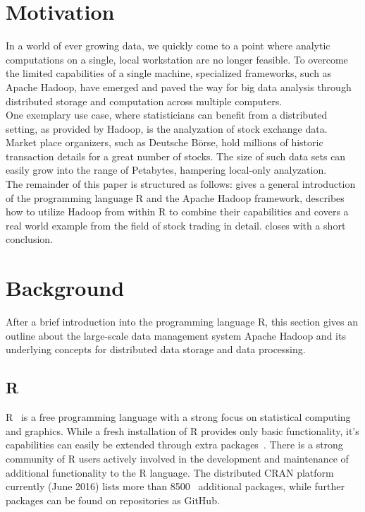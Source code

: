 \chapter{Motivation}
\label{chap:motivation}
In a world of ever growing data, we quickly come to a point where analytic computations on a single, local workstation are no longer feasible. To overcome the limited capabilities of a single machine, specialized frameworks, such as Apache Hadoop, have emerged and paved the way for big data analysis through distributed storage and computation across multiple computers.\\

One exemplary use case, where statisticians can benefit from a distributed setting, as provided by Hadoop, is the analyzation of stock exchange data. Market place organizers, such as Deutsche B\"orse, hold millions of historic transaction details for a great number of stocks. The size of such data sets can easily grow into the range of Petabytes, hampering local-only analyzation.
\\

The remainder of this paper is structured as follows:  gives a general introduction of the programming language R and the Apache Hadoop framework,  describes how to utilize Hadoop from within R to combine their capabilities and  covers a real world example from the field of stock trading in detail.  closes with a short conclusion.


\chapter{Background}
\label{chap:introduction}
After a brief introduction into the programming language R, this section gives an outline about the large-scale data management system Apache Hadoop and its underlying concepts for distributed data storage and data processing.

\section{R}
R~\cite{RLanguage} is a free programming language with a strong focus on statistical computing and graphics.
While a fresh installation of R provides only basic functionality, it's capabilities can easily be extended through extra packages~\cite{rPackages}. There is a strong community of R users actively involved in the development and maintenance of additional functionality to the R language. The distributed \ac{CRAN} platform currently (June 2016) lists more than 8500~\cite{CRAN} additional packages, while further packages can be found on repositories as \eg GitHub.

